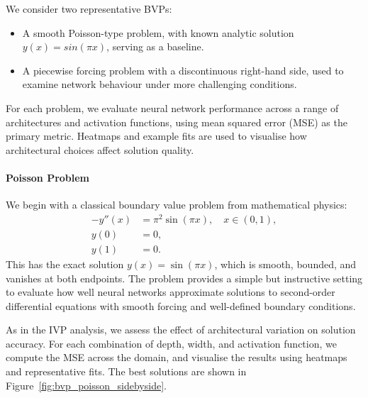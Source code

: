 We consider two representative BVPs:
\begin{itemize}
    \item A smooth Poisson-type problem, with known analytic solution $y(x)=sin(\pi x)$, 
    serving as a baseline. 
    \item A piecewise forcing problem with a discontinuous right-hand side, used to examine network
     behaviour under more challenging conditions. 
\end{itemize}

For each problem, we evaluate neural network performance across a range of architectures and 
activation functions, using mean squared error (MSE) as the primary metric. Heatmaps and example 
fits are used to visualise how architectural choices affect solution quality.



\paragraph{Poisson Problem}

We begin with a classical boundary value problem from mathematical physics:
\[
\begin{aligned}
    -y''(x) &= \pi^2 \sin(\pi x), \quad x \in (0, 1), \\
    y(0) &= 0, \\
    y(1) &= 0.
\end{aligned}
\]
This has the exact solution \( y(x) = \sin(\pi x) \), which is smooth, bounded, and vanishes at both 
endpoints.  
The problem provides a simple but instructive setting to evaluate how well neural networks approximate 
solutions to second-order differential equations with smooth forcing and well-defined boundary 
conditions.

As in the IVP analysis, we assess the effect of architectural variation on solution accuracy.
For each combination of depth, width, and activation function, we compute the MSE across the domain,
and visualise the results using heatmaps and representative fits. The best solutions are shown in 
Figure~\ref{fig:bvp_poisson_sidebyside}.

